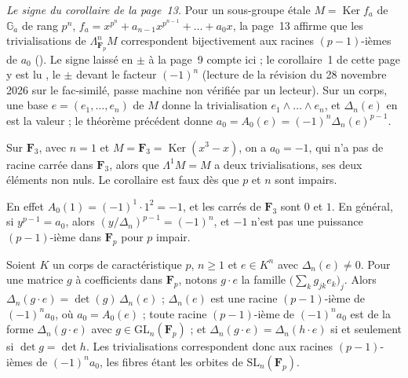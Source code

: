 \noindent\emph{Le signe du corollaire de la page~13.} Pour un sous-groupe étale $M = \operatorname{Ker} f_a$ de $\mathbb G_a$ de rang $p^n$, $f_a = x^{p^n} + a_{n-1}x^{p^{n-1}} + \dots + a_0 x$, la page~13 affirme que les trivialisations de $\Lambda^n_{\mathbf F_p} M$ correspondent bijectivement aux racines $(p-1)$-ièmes de $a_0$ (). Le signe laissé en $\pm$ à la page~9 compte ici ; le corollaire~1 de cette page y est lu , le $\pm$ devant le facteur $(-1)^n$ (lecture de la révision du 28 novembre 2026 sur le fac-similé, passe machine non vérifiée par un lecteur). Sur un corps, une base $e = (e_1, \dots, e_n)$ de $M$ donne la trivialisation $e_1 \wedge \dots \wedge e_n$, et $\Delta_n(e)$ en est la valeur ; le théorème précédent donne $a_0 = A_0(e) = (-1)^n \Delta_n(e)^{p-1}$.

\begin{encadre}
\begin{contrexemple}
Sur $\mathbf F_3$, avec $n = 1$ et $M = \mathbf F_3 = \operatorname{Ker}(x^3 - x)$, on a $a_0 = -1$, qui n'a pas de racine carrée dans $\mathbf F_3$, alors que $\Lambda^1 M = M$ a deux trivialisations, ses deux éléments non nuls. Le corollaire est faux dès que $p$ et $n$ sont impairs.
\end{contrexemple}
\end{encadre}

\noindent En effet $A_0(1) = (-1)^1 \cdot 1^2 = -1$, et les carrés de $\mathbf F_3$ sont $0$ et $1$. En général, si $y^{p-1} = a_0$, alors $(y/\Delta_n)^{p-1} = (-1)^n$, et $-1$ n'est pas une puissance $(p-1)$-ième dans $\mathbf F_p$ pour $p$ impair.

\begin{encadre}
\begin{enonce}
Soient $K$ un corps de caractéristique $p$, $n \geq 1$ et $e \in K^n$ avec $\Delta_n(e) \neq 0$. Pour une matrice $g$ à coefficients dans $\mathbf F_p$, notons $g \cdot e$ la famille $\bigl(\sum_k g_{jk} e_k\bigr)_j$. Alors $\Delta_n(g \cdot e) = \det(g)\,\Delta_n(e)$ ; $\Delta_n(e)$ est une racine $(p-1)$-ième de $(-1)^n a_0$, où $a_0 = A_0(e)$ ; toute racine $(p-1)$-ième de $(-1)^n a_0$ est de la forme $\Delta_n(g \cdot e)$ avec $g \in \mathrm{GL}_n(\mathbf F_p)$ ; et $\Delta_n(g \cdot e) = \Delta_n(h \cdot e)$ si et seulement si $\det g = \det h$. Les trivialisations correspondent donc aux racines $(p-1)$-ièmes de $(-1)^n a_0$, les fibres étant les orbites de $\mathrm{SL}_n(\mathbf F_p)$.
\end{enonce}
\end{encadre}

